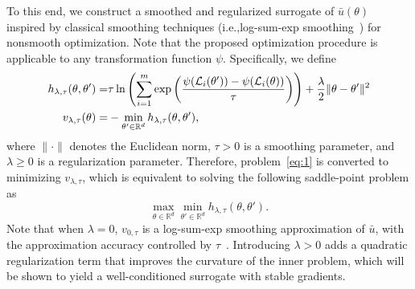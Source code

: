 \documentclass[sigconf]{acmart}
\begin{document}
To this end, we construct a smoothed and regularized surrogate of $\bar{u}(\theta)$ inspired by classical smoothing techniques (i.e.,log-sum-exp smoothing~\cite{nesterov2005smooth,beck2017first}) for nonsmooth optimization. 
Note that the proposed optimization procedure is applicable to any transformation function $\psi$. 
Specifically, we define%
\begin{align}
h_{\lambda, \tau}(\theta,\theta')
=&\tau \ln \left(\sum_{i=1}^{m}\exp\left(\frac{\psi(\mathcal{L}_i(\theta'))-\psi(\mathcal{L}_i(\theta))}{\tau}\right)\right)\notag+\frac{\lambda}{2}\|\theta-\theta'\|^2 \nonumber\\
v_{\lambda, \tau}(\theta)=&-\min_{\theta'\in \mathbb{R}^d}h_{\lambda,\tau}(\theta,\theta'),\label{eq:v}
\end{align}
where $\|\cdot\|$ denotes the Euclidean norm, $\tau>0$ is a smoothing parameter, and $\lambda\ge 0$ is a regularization parameter. Therefore, problem~\eqref{eq:1} is converted to minimizing $v_{\lambda,\tau}$, which is equivalent to solving the following saddle-point problem as
\begin{equation}
    \max_{\theta\in \mathbb{R}^d}\min_{\theta'\in \mathbb{R}^d}
    h_{\lambda,\tau}(\theta,\theta').
    \label{eq:vltau}
\end{equation}
Note that when $\lambda=0$, $v_{0,\tau}$ is a log-sum-exp smoothing approximation of $\bar{u}$, with the approximation accuracy controlled by $\tau$~\cite{nesterov2005smooth,boyd2004convex}. Introducing $\lambda>0$ adds a quadratic regularization term that improves the curvature of the inner problem, which will be shown to yield a well-conditioned surrogate with stable gradients. %
\end{document}
